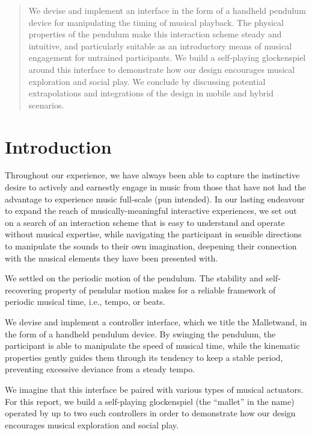 \documentclass{nime-alternate} %
\begin{document}
\begin{abstract}
We devise and implement an interface in the form of a handheld pendulum device for manipulating the timing of musical playback. The physical properties of the pendulum make this interaction scheme steady and intuitive, and particularly suitable as an introductory means of musical engagement for untrained participants. We build a self-playing glockenspiel around this interface to demonstrate how our design encourages musical exploration and social play. We conclude by discussing potential extrapolations and integrations of the design in mobile and hybrid scenarios.
\end{abstract}

\printccsdesc


\section{Introduction}

Throughout our experience, we have always been able to capture the instinctive desire to actively and earnestly engage in music from those that have not had the advantage to experience music full-scale (pun intended).
In our lasting endeavour to expand the reach of musically-meaningful interactive experiences, we set out on a search of an interaction scheme that is easy to understand and operate without musical expertise, while navigating the participant in sensible directions to manipulate the sounds to their own imagination, deepening their connection with the musical elements they have been presented with.

We settled on the periodic motion of the pendulum. The stability and self-recovering property of pendular motion makes for a reliable framework of periodic musical time, i.e., tempo, or beats.

We devise and implement a controller interface, which we title the Malletwand, in the form of a handheld pendulum device. By swinging the pendulum, the participant is able to manipulate the speed of musical time, while the kinematic properties gently guides them through its tendency to keep a stable period, preventing excessive deviance from a steady tempo.

We imagine that this interface be paired with various types of musical actuators. For this report, we build a self-playing glockenspiel (the ``mallet'' in the name) operated by up to two such controllers in order to demonstrate how our design encourages musical exploration and social play.
\end{document}
